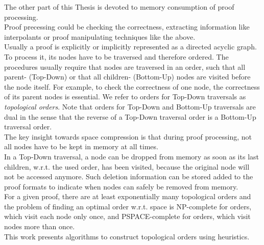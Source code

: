 The other part of this Thesis is devoted to memory consumption of proof processing.\\
Proof precessing could be checking the correctness, extracting information like interpolants or proof manipulating techniques like the above.\\
Usually a proof is explicitly or implicitly represented as a directed acyclic graph.
To process it, its nodes have to be traversed and therefore ordered.
The procedures usually require that nodes are traversed in an order, such that all parent- (Top-Down) or that all children- (Bottom-Up) nodes are visited before the node itself.
For example, to check the correctness of one node, the correctness of its parent nodes is essential. 
We refer to orders for Top-Down traversals as \emph{topological orders}. Note that orders for Top-Down and Bottom-Up traversals are dual in the sense that the reverse of a Top-Down traversal order is a Bottom-Up traversal order.\\
The key insight towards space compression is that during proof processing, not all nodes have to be kept in memory at all times.\\
In a Top-Down traversal, a node can be dropped from memory as soon as its last children, w.r.t. the used order, has been visited, because the original node will not be accessed anymore.
Such deletion information can be stored added to the proof formats to indicate when nodes can safely be removed from memory.\\
For a given proof, there are at least exponentially many topological orders and the problem of finding an optimal order w.r.t. space is NP-complete \cite{Sethi1975} for orders, which visit each node only once, and PSPACE-complete \cite{Gilbert1980} for orders, which visit nodes more than once.\\
This work presents algorithms to construct topological orders using heuristics.


